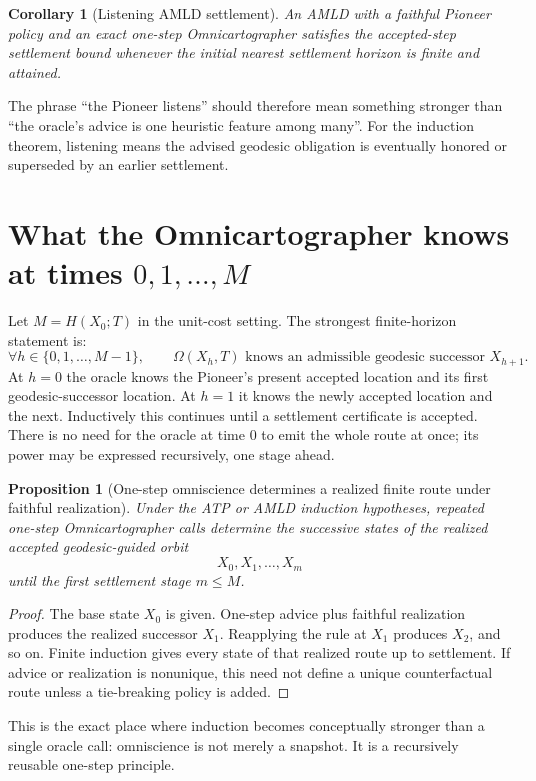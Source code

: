 \documentclass[11pt]{article}
\newtheorem{proposition}[definition]{Proposition}
\newtheorem{corollary}[definition]{Corollary}
\theoremstyle{remark}
\newcommand{\Omni}{\Omega}
\begin{document}
\begin{corollary}[Listening AMLD settlement]
An AMLD with a faithful Pioneer policy and an exact one-step Omnicartographer satisfies the accepted-step settlement bound whenever the initial nearest settlement horizon is finite and attained.
\end{corollary}

The phrase ``the Pioneer listens'' should therefore mean something stronger than ``the oracle's advice is one heuristic feature among many''. For the induction theorem, listening means the advised geodesic obligation is eventually honored or superseded by an earlier settlement.

\section{What the Omnicartographer knows at times $0,1,\dots,M$}

Let $M=H(X_0;T)$ in the unit-cost setting. The strongest finite-horizon statement is:
\[
\forall h\in\{0,1,\dots,M-1\},\qquad
\Omni(X_h,T)\text{ knows an admissible geodesic successor }X_{h+1}.
\]
At $h=0$ the oracle knows the Pioneer's present accepted location and its first geodesic-successor location. At $h=1$ it knows the newly accepted location and the next. Inductively this continues until a settlement certificate is accepted. There is no need for the oracle at time $0$ to emit the whole route at once; its power may be expressed recursively, one stage ahead.

\begin{proposition}[One-step omniscience determines a realized finite route under faithful realization]
Under the ATP or AMLD induction hypotheses, repeated one-step Omnicartographer calls determine the successive states of the realized accepted geodesic-guided orbit
\[
X_0,X_1,\dots,X_m
\]
until the first settlement stage $m\le M$.
\end{proposition}
\begin{proof}
The base state $X_0$ is given. One-step advice plus faithful realization produces the realized successor $X_1$. Reapplying the rule at $X_1$ produces $X_2$, and so on. Finite induction gives every state of that realized route up to settlement. If advice or realization is nonunique, this need not define a unique counterfactual route unless a tie-breaking policy is added.
\end{proof}

This is the exact place where induction becomes conceptually stronger than a single oracle call: omniscience is not merely a snapshot. It is a recursively reusable one-step principle.
\end{document}
